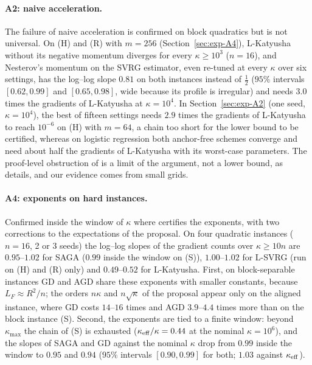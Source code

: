 \paragraph{A2: naive acceleration.}
The failure of naive acceleration is confirmed on block quadratics but is not universal. On (H) and (R) with $m=256$
(Section~\ref{sec:exp-A4}), L-Katyusha without its negative momentum diverges for every $\kappa\ge10^3$ ($n=16$), and
Nesterov's momentum on the SVRG estimator, even re-tuned at every $\kappa$ over six settings, has the log--log slope
$0.81$ on both instances instead of $\frac12$ ($95\%$ intervals $[0.62,0.99]$ and $[0.65,0.98]$, wide because its
profile is irregular) and needs $3.0$ times the gradients of L-Katyusha at $\kappa=10^4$. In Section~\ref{sec:exp-A2}
(one seed, $\kappa=10^4$), the best of fifteen settings needs $2.9$ times the gradients of L-Katyusha to reach $10^{-6}$
on (H) with $m=64$, a chain too short for the lower bound to be certified, whereas on logistic regression both
anchor-free schemes converge and need about half the gradients of L-Katyusha with its worst-case parameters. The
proof-level obstruction of  is a limit of the argument, not a lower bound, as
 details, and our evidence comes from small grids.

\paragraph{A4: exponents on hard instances.}
Confirmed inside the window of $\kappa$ where  certifies the exponents, with two corrections to the
expectations of the proposal. On four quadratic instances ($n=16$, 2 or 3 seeds) the log--log slopes of the gradient
counts over $\kappa\ge10n$ are $0.95$--$1.02$ for SAGA ($0.99$ inside the window on (S)), $1.00$--$1.02$ for L-SVRG (run on (H)
and (R) only) and $0.49$--$0.52$ for L-Katyusha. First, on block-separable instances GD and AGD share these exponents
with smaller constants, because $L_F\approx R^2/n$; the orders $n\kappa$ and $n\sqrt\kappa$ of the proposal appear only
on the aligned instance, where GD costs $14$--$16$ times and AGD $3.9$--$4.4$ times more than on the block instance (S).
Second, the exponents are tied to a finite window: beyond $\kappa_{\max}$ the chain of (S) is exhausted
($\kappa_{\rm eff}/\kappa=0.44$ at the nominal $\kappa=10^6$), and the slopes of SAGA and GD against the nominal
$\kappa$ drop from $0.99$ inside the window to $0.95$ and $0.94$ ($95\%$ intervals $[0.90,0.99]$ for both; $1.03$ against
$\kappa_{\rm eff}$).

